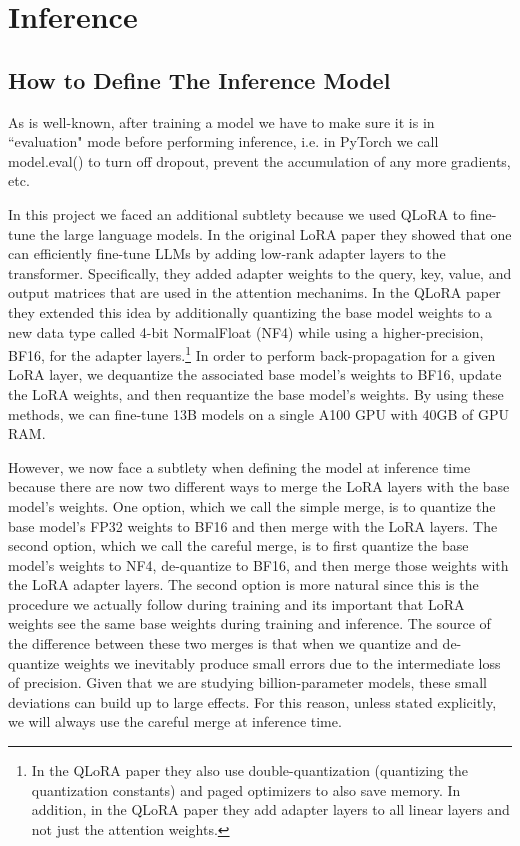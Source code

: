 \documentclass[11pt, oneside]{article}   	%
\begin{document}
\section{Inference}

\subsection{How to Define The Inference Model}
As is well-known, after training a model we have to make sure it is in ``evaluation" mode before performing inference, i.e. in PyTorch we call model.eval() to turn off dropout, prevent the accumulation of any more gradients, etc.

In this project we faced an additional subtlety because we used QLoRA to fine-tune the large language models.
In the original LoRA paper \cite{hu2021lora} they showed that one can efficiently fine-tune LLMs by adding low-rank adapter layers to the transformer.
Specifically, they added adapter weights to the query, key, value, and output matrices that are used in the attention mechanims.
In the QLoRA paper \cite{dettmers2023qlora} they extended this idea by additionally quantizing the base model weights to a new data type called 4-bit NormalFloat (NF4) while using a higher-precision, BF16, for the adapter layers.\footnote{In the QLoRA paper they also use double-quantization (quantizing the quantization constants) and paged optimizers to also save memory. In addition, in the QLoRA paper they add adapter layers to all linear layers and not just the attention weights.}
In order to perform back-propagation for a given LoRA layer, we dequantize the associated base model's weights to BF16, update the LoRA weights, and then requantize the base model's weights.
By using these methods, we can fine-tune 13B models on a single A100 GPU with 40GB of GPU RAM.

However, we now face a subtlety when defining the model at inference time because there are now two different ways to merge the LoRA layers with the base model's weights.
One option, which we call the simple merge, is to quantize the base model's FP32 weights to BF16 and then merge with the LoRA layers.
The second option, which we call the careful merge, is to first quantize the base model's weights to NF4, de-quantize to BF16, and then merge those weights with the LoRA adapter layers.
The second option is more natural since this is the procedure we actually follow during training and its important that LoRA weights see the same base weights during training and inference.
The source of the difference between these two merges is that when we quantize and de-quantize weights we inevitably produce small errors due to the intermediate loss of precision.
Given that we are studying billion-parameter models, these small deviations can build up to large effects.
For this reason, unless stated explicitly, we will always use the careful merge at inference time.
\end{document}

